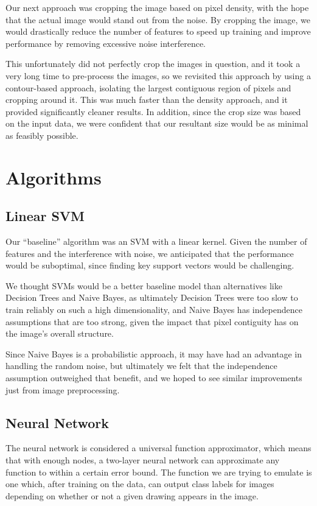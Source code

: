 \documentclass[conference]{IEEEtran}
\begin{document}
Our next approach was cropping the image based on pixel density, with the hope that the actual image would stand out from the noise. By cropping the image, we would drastically reduce the number of features to speed up training and improve performance by removing excessive noise interference.

This unfortunately did not perfectly crop the images in question, and it took a very long time to pre-process the images, so we revisited this approach by using a contour-based approach, isolating the largest contiguous region of pixels and cropping around it. This was much faster than the density approach, and it provided significantly cleaner results. In addition, since the crop size was based on the input data, we were confident that our resultant size would be as minimal as feasibly possible.

\section{\textbf{Algorithms}}

\subsection{Linear SVM}

Our ``baseline'' algorithm was an SVM with a linear kernel. Given the number of features and the interference with noise, we anticipated that the performance would be suboptimal, since finding key support vectors would be challenging.

We thought SVMs would be a better baseline model than alternatives like Decision Trees and Naive Bayes, as ultimately Decision Trees were too slow to train reliably on such a high dimensionality, and Naive Bayes has independence assumptions that are too strong, given the impact that pixel contiguity has on the image's overall structure. 

Since Naive Bayes is a probabilistic approach, it may have had an advantage in handling the random noise, but ultimately we felt that the independence assumption outweighed that benefit, and we hoped to see similar improvements just from image preprocessing.

\subsection{Neural Network}

The neural network is considered a universal function approximator, which means that with enough nodes, a two-layer neural network can approximate any function to within a certain error bound. The function we are trying to emulate is one which, after training on the data, can output class labels for images depending on whether or not a given drawing appears in the image.
\end{document}
